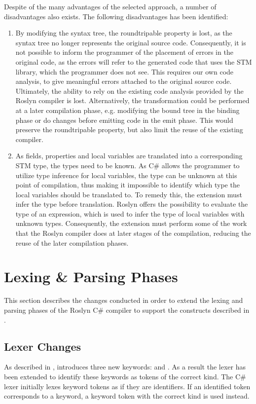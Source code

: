 Despite of the many advantages of the selected approach, a number of disadvantages also exists. The following disadvantages has been identified:
\begin{enumerate}
	\item By modifying the syntax tree, the roundtripable property is lost, as the syntax tree no longer represents the original source code. Consequently, it is not possible to inform the programmer of the placement of errors in the original code, as the errors will refer to the generated code that uses the \ac{STM} library, which the programmer does not see. This requires our own code analysis, to give meaningful errors attached to the original source code. Ultimately, the ability to rely on the existing code analysis provided by the Roslyn compiler is lost. Alternatively, the transformation could be performed at a later compilation phase, e.g. modifying the bound tree in the binding phase or do changes before emitting code in the emit phase. This would preserve the roundtripable property, but also limit the reuse of the existing compiler. 
	
	\item As  fields, properties and local variables are translated into a corresponding \ac{STM} type, the types need to be known. As C\# allows the programmer to utilize type inference for local variables, the type can be unknown at this point of compilation, thus making it impossible to identify which type the local variables should be translated to. To remedy this, the extension must infer the type before translation. Roslyn offers the possibility to evaluate the type of an expression, which is used to infer the type of  local variables with unknown types. Consequently, the extension must perform some of the work that the Roslyn compiler does at later stages of the compilation, reducing the reuse of the later compilation phases.
\end{enumerate}

\section{Lexing \& Parsing Phases}
This section describes the changes conducted in order to extend the lexing and parsing phases of the Roslyn C\# compiler to support the constructs described in .
\label{sec:roslyn_lexer_parser_changes}

\subsection{Lexer Changes}
As described in , \stmnamesp introduces three new keywords:   and . As a result the lexer has been extended to identify these keywords as tokens of the correct kind. The C\# lexer initially lexes keyword tokens as if they are identifiers. If an identified token corresponds to a keyword, a keyword token with the correct kind is used instead.

